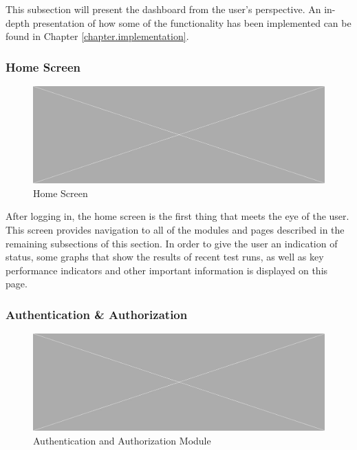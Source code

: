 This subsection will present the dashboard from the user's perspective. An in-depth presentation of how some of the functionality has been implemented can be found in Chapter \ref{chapter.implementation}.





\subsubsection{Home Screen}

\comment{\info[inline]{}}

\begin{figure}[h]
    \centering
    \includegraphics[width=\textwidth]{figures/placeholder.png}
    \caption{Home Screen}
    \label{fig.home}
\end{figure}
\noindent
After logging in, the home screen is the first thing that meets the eye of the user. This screen provides navigation to all of the modules and pages described in the remaining subsections of this section. In order to give the user an indication of status, some graphs that show the results of recent test runs, as well as key performance indicators and other important information is displayed on this page.


\subsubsection{Authentication \& Authorization}


\begin{figure}[h]
    \centering
    \includegraphics[width=\textwidth]{figures/placeholder.png}
    \caption{Authentication and Authorization Module}
    \label{fig.tc_mod}
\end{figure}

